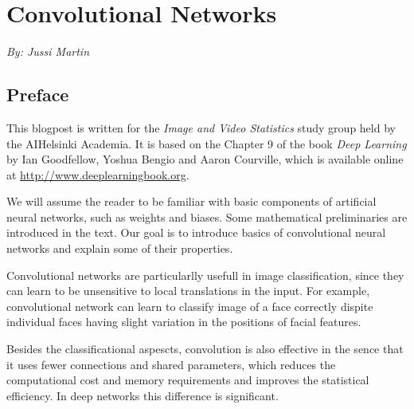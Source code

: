 \documentclass[]{article}
\begin{document}
\section{Convolutional Networks}
\begin{center}
  \emph{By: Jussi Martin}
\end{center}
\subsection{Preface}
This blogpost is written for the \emph{Image and Video Statistics} study group
held by the AIHelsinki Academia. It is based on the Chapter 9 of the book
\emph{Deep Learning} by Ian Goodfellow, Yoshua Bengio and Aaron Courville, which
is
available
online at \url{http://www.deeplearningbook.org}.

We will assume the reader to be familiar with basic components of artificial
neural networks, such as weights and biases. Some mathematical preliminaries are
introduced in the text. Our goal is to introduce basics of convolutional neural
networks and explain some of their properties.

Convolutional networks are particularlly usefull in image classification, since
they can learn to be unsensitive to local translations in the input. For example,
convolutional network can learn to classify image of a face correctly dispite
individual faces having slight variation in the positions of facial features.

Besides the classificational aspescts, convolution is also effective in the sence
that it uses fewer connections and shared parameters, which reduces the
computational cost and memory requirements and improves the statistical efficiency.
In deep networks this difference is significant.


\end{document}
